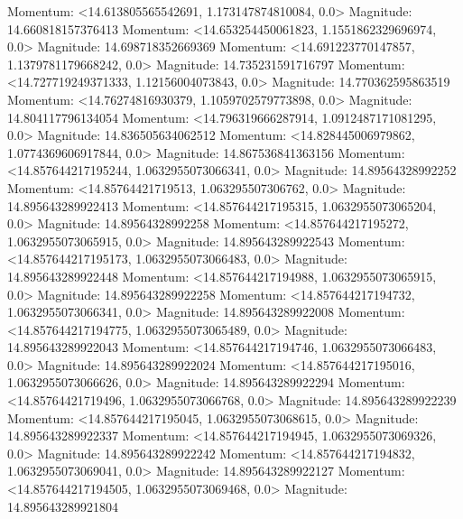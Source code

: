 \documentclass[10pt]{article}
\begin{document}
Momentum: <14.613805565542691, 1.173147874810084, 0.0> Magnitude: 14.660818157376413
Momentum: <14.653254450061823, 1.1551862329696974, 0.0> Magnitude: 14.698718352669369
Momentum: <14.691223770147857, 1.1379781179668242, 0.0> Magnitude: 14.735231591716797
Momentum: <14.727719249371333, 1.12156004073843, 0.0> Magnitude: 14.770362595863519
Momentum: <14.76274816930379, 1.1059702579773898, 0.0> Magnitude: 14.804117796134054
Momentum: <14.796319666287914, 1.0912487171081295, 0.0> Magnitude: 14.836505634062512
Momentum: <14.828445006979862, 1.0774369606917844, 0.0> Magnitude: 14.867536841363156
Momentum: <14.857644217195244, 1.0632955073066341, 0.0> Magnitude: 14.89564328992252
Momentum: <14.85764421719513, 1.063295507306762, 0.0> Magnitude: 14.895643289922413
Momentum: <14.857644217195315, 1.0632955073065204, 0.0> Magnitude: 14.89564328992258
Momentum: <14.857644217195272, 1.0632955073065915, 0.0> Magnitude: 14.895643289922543
Momentum: <14.857644217195173, 1.0632955073066483, 0.0> Magnitude: 14.895643289922448
Momentum: <14.857644217194988, 1.0632955073065915, 0.0> Magnitude: 14.895643289922258
Momentum: <14.857644217194732, 1.0632955073066341, 0.0> Magnitude: 14.895643289922008
Momentum: <14.857644217194775, 1.0632955073065489, 0.0> Magnitude: 14.895643289922043
Momentum: <14.857644217194746, 1.0632955073066483, 0.0> Magnitude: 14.895643289922024
Momentum: <14.857644217195016, 1.0632955073066626, 0.0> Magnitude: 14.895643289922294
Momentum: <14.85764421719496, 1.0632955073066768, 0.0> Magnitude: 14.895643289922239
Momentum: <14.857644217195045, 1.0632955073068615, 0.0> Magnitude: 14.895643289922337
Momentum: <14.857644217194945, 1.0632955073069326, 0.0> Magnitude: 14.895643289922242
Momentum: <14.857644217194832, 1.0632955073069041, 0.0> Magnitude: 14.895643289922127
Momentum: <14.857644217194505, 1.0632955073069468, 0.0> Magnitude: 14.895643289921804
\end{document}
